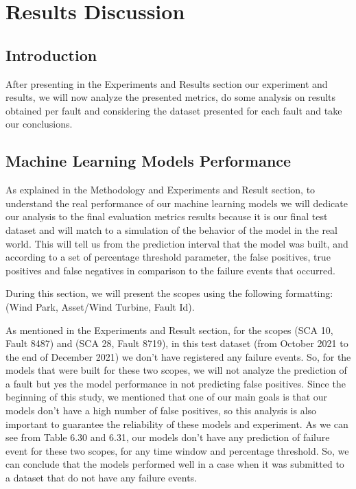 

\chapter{Results Discussion}
\label{cha:Results Discussion}

\section{Introduction} 
\label{sub:Results Discussion/Introduction}
After presenting in the Experiments and Results section our experiment and results, we will now analyze the presented metrics, do some analysis on results obtained per fault and considering the dataset presented for each fault and take our conclusions.

\section{Machine Learning Models Performance}
As explained in the Methodology and Experiments and Result section, to understand the real performance of our machine learning models we will dedicate our analysis to the final evaluation metrics results because it is our final test dataset and will match to a simulation of the behavior of the model in the real world. This will tell us from the prediction interval that the model was built, and according to a set of percentage threshold parameter, the false positives, true positives and false negatives in comparison to the failure events that occurred.

During this section, we will present the scopes using the following formatting: (Wind Park, Asset/Wind Turbine, Fault Id).

As mentioned in the Experiments and Result section, for the scopes (SCA 10, Fault 8487) and (SCA 28, Fault 8719), in this test dataset (from October 2021 to the end of December 2021) we don't have registered any failure events. So, for the models that were built for these two scopes, we will not analyze the prediction of a fault but yes the model performance in not predicting false positives. Since the beginning of this study, we mentioned that one of our main goals is that our models don't have a high number of false positives, so this analysis is also important to guarantee the reliability of these models and experiment. As we can see from Table 6.30 and 6.31, our models don't have any prediction of failure event for these two scopes, for any time window and percentage threshold. So, we can conclude that the models performed well in a case when it was submitted to a dataset that do not have any failure events.

